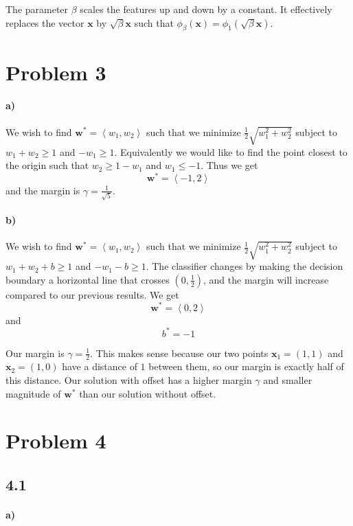 \documentclass[12pt]{article}
\begin{document}
The parameter \(\beta\) scales the features up and down by a constant. It effectively replaces the vector \(\mathbf{x}\) by \(\sqrt{\beta}\mathbf{x}\)
such that \(\phi_\beta(\mathbf{x})=\phi_1(\sqrt{\beta}\mathbf{x})\).

\section*{Problem 3}

\paragraph{a)}

We wish to find \(\mathbf{w}^*=\left<w_1,w_2\right>\) such that we minimize \(\frac{1}{2}\sqrt{w_1^2+w_2^2}\) subject to \(w_1+w_2\geq 1\) and \(-w_1\geq 1\).
Equivalently we would like to find the point closest to the origin such that \(w_2\geq 1-w_1\) and \(w_1\leq -1\). Thus we get
\[\mathbf{w}^*=\left<-1,2\right>\]
and the margin is \(\gamma=\frac{1}{\sqrt{5}}\).

\paragraph{b)}

We wish to find \(\mathbf{w}^*=\left<w_1,w_2\right>\) such that we minimize \(\frac{1}{2}\sqrt{w_1^2+w_2^2}\) subject to \(w_1+w_2+b\geq 1\) and \(-w_1-b\geq 1\).
The classifier changes by making the decision boundary a horizontal line that crosses \(\left(0,\frac{1}{2}\right)\), and the margin will increase compared to our
previous results. We get
\[\mathbf{w}^*=\left<0,2\right>\]
and
\[b^*=-1\]

Our margin is \(\gamma=\frac{1}{2}\). This makes sense because our two points \(\mathbf{x}_1=(1,1)\) and \(\mathbf{x}_2=(1,0)\) have a distance of \(1\) between them,
so our margin is exactly half of this distance. Our solution with offset has a higher margin \(\gamma\) and smaller magnitude of \(\mathbf{w}^*\) than our
solution without offset.

\section*{Problem 4}

\subsection*{4.1}

\paragraph{a)}
\end{document}

